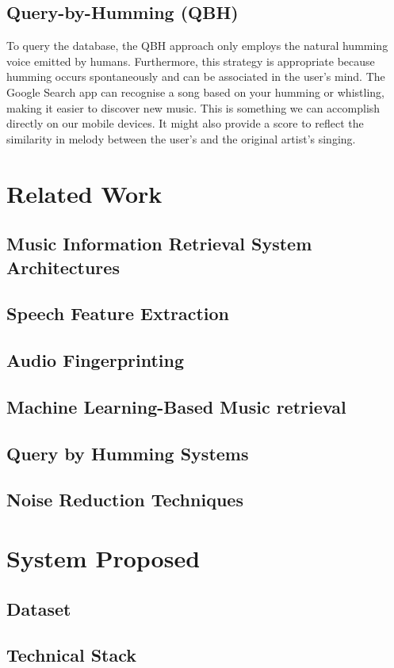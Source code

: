 \documentclass[conference]{IEEEtran}
\begin{document}
\subsection{Query-by-Humming (QBH)}
To query the database, the QBH approach only employs the natural humming voice emitted by humans. Furthermore, this strategy is appropriate because humming occurs spontaneously and can be associated in the user's mind.
The Google Search app can recognise a song based on your humming or whistling, making it easier to discover new music. This is something we can accomplish directly on our mobile devices. It might also provide a score to reflect the similarity in melody between the user's and the original artist's singing.

\section{Related Work}
\subsection{Music Information Retrieval System Architectures}
\subsection{Speech Feature Extraction}
\subsection{Audio Fingerprinting}
\subsection{Machine Learning-Based Music retrieval}
\subsection{Query by Humming Systems}
\subsection{Noise Reduction Techniques}

\section{System Proposed}
\subsection{Dataset}
\subsection{Technical Stack}
\end{document}
